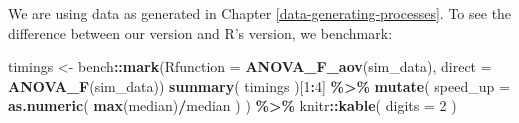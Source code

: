 \documentclass[
]{book}
\newenvironment{Shaded}{\begin{snugshade}}{\end{snugshade}}
\newcommand{\AttributeTok}[1]{\textcolor[rgb]{0.13,0.29,0.53}{#1}}
\newcommand{\ConstantTok}[1]{\textcolor[rgb]{0.56,0.35,0.01}{#1}}
\newcommand{\ControlFlowTok}[1]{\textcolor[rgb]{0.13,0.29,0.53}{\textbf{#1}}}
\newcommand{\DecValTok}[1]{\textcolor[rgb]{0.00,0.00,0.81}{#1}}
\newcommand{\FunctionTok}[1]{\textcolor[rgb]{0.13,0.29,0.53}{\textbf{#1}}}
\newcommand{\NormalTok}[1]{#1}
\newcommand{\OtherTok}[1]{\textcolor[rgb]{0.56,0.35,0.01}{#1}}
\newcommand{\SpecialCharTok}[1]{\textcolor[rgb]{0.81,0.36,0.00}{\textbf{#1}}}
\begin{document}
\begin{Shaded}
\end{Shaded}

We are using data as generated in Chapter \ref{data-generating-processes}.
To see the difference between our version and R's version, we benchmark:

\begin{Shaded}
\begin{Highlighting}[]
\NormalTok{timings }\OtherTok{\textless{}{-}}\NormalTok{ bench}\SpecialCharTok{::}\FunctionTok{mark}\NormalTok{(}\AttributeTok{Rfunction =} \FunctionTok{ANOVA\_F\_aov}\NormalTok{(sim\_data),}
                          \AttributeTok{direct    =} \FunctionTok{ANOVA\_F}\NormalTok{(sim\_data))}
\FunctionTok{summary}\NormalTok{( timings )[}\DecValTok{1}\SpecialCharTok{:}\DecValTok{4}\NormalTok{] }\SpecialCharTok{\%\textgreater{}\%}
  \FunctionTok{mutate}\NormalTok{( }\AttributeTok{speed\_up =} \FunctionTok{as.numeric}\NormalTok{( }\FunctionTok{max}\NormalTok{(median)}\SpecialCharTok{/}\NormalTok{median ) ) }\SpecialCharTok{\%\textgreater{}\%}
\NormalTok{  knitr}\SpecialCharTok{::}\FunctionTok{kable}\NormalTok{( }\AttributeTok{digits =} \DecValTok{2}\NormalTok{ )}
\end{Highlighting}
\end{Shaded}
\end{document}
